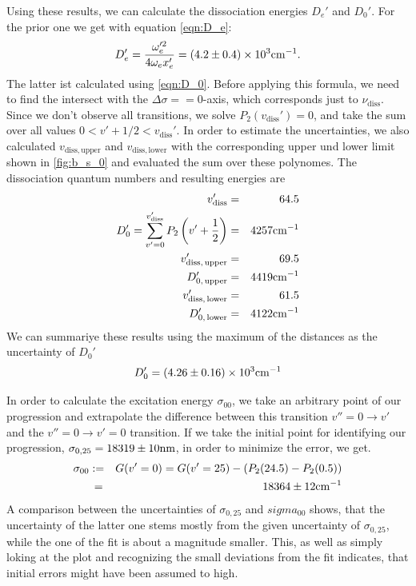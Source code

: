 Using these results, we can calculate the dissociation energies $D_e'$ and $D_0'$. For the 
prior one we get with equation \eqref{eqn:D_e}:
\begin{equation}
    D_e' = \frac{ \omega_e'^2}{ 4  \omega_e x_e'} =\left(4.2 \pm 0.4\right) \times 10^{3} \mathrm{cm^{-1}}.
\end{equation}
The latter ist calculated using \ref{eqn:D_0}. Before applying this formula, we need to find 
the intersect with the $\Delta \sigma == 0$-axis, which corresponds just to 
$\nu_\mathrm{diss}$. Since we don't observe all transitions, we solve $P_2(v_\mathrm{diss}') = 0$, and 
take the sum over all values $0 < v' + 1/2 < v_\mathrm{diss}'$. In order to estimate the 
uncertainties, we also calculated $v_\mathrm{diss, upper}$ and  $v_\mathrm{diss, lower}$ with 
the corresponding upper und lower limit shown in \ref{fig:b_s_0} and evaluated the sum over 
these polynomes. The dissociation quantum numbers and resulting energies are 
\begin{eqnarray}
    v_\mathrm{diss}' &=& 64.5 \\
    D_0' = \sum_{v' = 0 }^{v'_\mathrm{diss}} P_2 \left (v' + \frac{1}{2} \right ) &=& 4257 \mathrm{cm^{-1}} \\
    v_\mathrm{diss,\, upper}' &=& 69.5 \\
    D_{0,\, \mathrm{upper}}' &=& 4419 \mathrm{cm^{-1}}\\
    v_\mathrm{diss,\, lower}' &=& 61.5 \\
    D_{0,\, \mathrm{lower}}' &=& 4122 \mathrm{cm^{-1}}
\end{eqnarray}
We can summariye these results using the maximum of the distances as the uncertainty of $D_0'$
\begin{equation}
    D_0' = \left(4.26 \pm 0.16\right) \times 10^{3} \mathrm{cm^{-1}}
\end{equation}

In order to calculate the excitation energy $\sigma_{00}$, we take an arbitrary point of our 
progression and extrapolate the difference between this transition 
$v''= 0 \rightarrow v'$ and the $v'' = 0 \rightarrow v' = 0$ transition. If we take the initial 
point for identifying our progression, $\sigma_{0, 25} = 18319 \pm 10\mathrm{nm}$, in order 
to minimize the error, we get.
\begin{eqnarray}
    \sigma_{00} &:=& G(v' = 0) = G(v' = 25) - (P_2(24.5) - P_2(0.5)) \nonumber \\
                 &\, =& 18364 \pm 12 \mathrm{cm^{-1}}
\end{eqnarray}
A comparison between the uncertainties of $\sigma_{0, 25}$ and $sigma_{00}$ shows, 
that the uncertainty of the latter one stems mostly from the given uncertainty 
of $\sigma_{0, 25}$, while the one of the fit is about a magnitude smaller. This, 
as well as simply loking at the plot and recognizing the small deviations from 
the fit indicates, that initial errors might have been assumed to high. 

